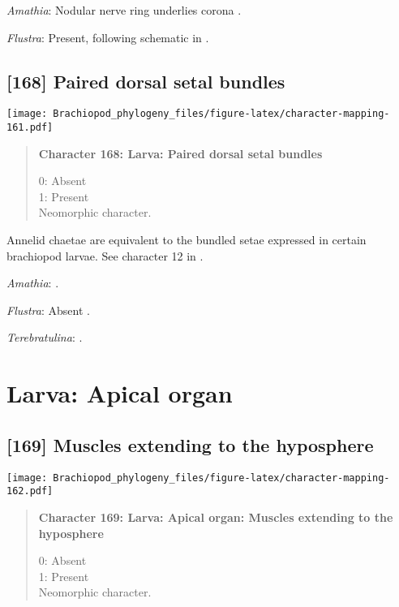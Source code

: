\documentclass[openany]{book}
\theoremstyle{definition}
\theoremstyle{definition}
\theoremstyle{definition}
\theoremstyle{remark}
\begin{document}
\hypertarget{Amathia-coding-167}{}
\emph{Amathia}: Nodular nerve ring underlies corona \citep{Reed1982}.

\hypertarget{Flustra-coding-167}{}
\emph{Flustra}: Present, following schematic in \citet{Gruhl2016}.

\subsection*{{[}168{]} Paired dorsal setal
bundles}\label{paired-dorsal-setal-bundles}

\texttt{[image: Brachiopod\_phylogeny\_files/figure-latex/character-mapping-161.pdf]}

\begin{quote}
\textbf{Character 168: Larva: Paired dorsal setal bundles}

0: Absent\\
1: Present\\
Neomorphic character.
\end{quote}

Annelid chaetae are equivalent to the bundled setae expressed in certain
brachiopod larvae. See character 12 in \citet{Vinther2008}.

\hypertarget{Amathia-coding-168}{}
\emph{Amathia}: \citep{Reed1982}.

\hypertarget{Flustra-coding-168}{}
\emph{Flustra}: Absent \citep{Zimmer2013}.

\hypertarget{Terebratulina-coding-168}{}
\emph{Terebratulina}: \citet{Williams1997Introduction}.

\section{Larva: Apical organ}\label{larva-apical-organ}

\subsection*{{[}169{]} Muscles extending to the
hyposphere}\label{muscles-extending-to-the-hyposphere}

\texttt{[image: Brachiopod\_phylogeny\_files/figure-latex/character-mapping-162.pdf]}

\begin{quote}
\textbf{Character 169: Larva: Apical organ: Muscles extending to the
hyposphere}

0: Absent\\
1: Present\\
Neomorphic character.
\end{quote}
\end{document}
